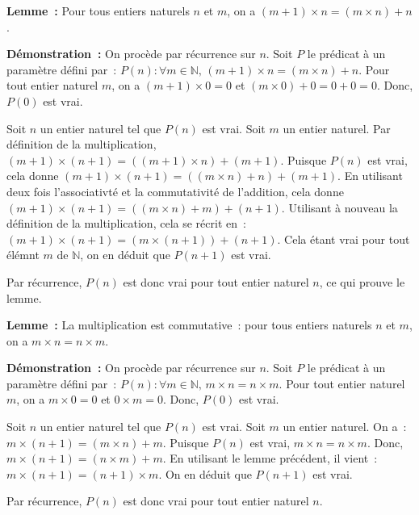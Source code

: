    \done 

\medskip

\noindent\textbf{Lemme :} Pour tous entiers naturels $n$ et $m$, on a $(m+1) \times n = (m \times n) + n$.

\medskip

\noindent\textbf{Démonstration :} On procède par récurrence sur $n$. 
    Soit $P$ le prédicat à un paramètre défini par : $P(n): \forall m \in \mathbb{N}, \, (m+1) \times n = (m \times n) + n$. 
    Pour tout entier naturel $m$, on a $(m+1) \times 0 = 0$ et $(m \times 0) + 0 = 0 + 0 = 0$. 
    Donc, $P(0)$ est vrai. 

    Soit $n$ un entier naturel tel que $P(n)$ est vrai. 
    Soit $m$ un entier naturel. 
    Par définition de la multiplication, $(m+1) \times (n+1) = ((m+1) \times n) + (m+1)$. 
    Puisque $P(n)$ est vrai, cela donne $(m+1) \times (n+1) = ((m \times n) + n) + (m+1)$. 
    En utilisant deux fois l'associativté et la commutativité de l'addition, cela donne $(m+1) \times (n+1) = ((m \times n) + m) + (n+1)$. 
    Utilisant à nouveau la définition de la multiplication, cela se récrit en : $(m+1) \times (n+1) = (m \times (n+1)) + (n+1)$. 
    Cela étant vrai pour tout élémnt $m$ de $\mathbb{N}$, on en déduit que $P(n+1)$ est vrai. 

    Par récurrence, $P(n)$ est donc vrai pour tout entier naturel $n$, ce qui prouve le lemme.

   \done 

\medskip

\noindent\textbf{Lemme :} La multiplication est commutative : pour tous entiers naturels $n$ et $m$, on a $m \times n = n \times m$.

\medskip

\noindent\textbf{Démonstration :} On procède par récurrence sur $n$. 
    Soit $P$ le prédicat à un paramètre défini par : $P(n): \forall m \in \mathbb{N}, \, m \times n = n \times m$. 
    Pour tout entier naturel $m$, on a $m \times 0 = 0$ et $0 \times m = 0$. 
    Donc, $P(0)$ est vrai. 

    Soit $n$ un entier naturel tel que $P(n)$ est vrai. 
    Soit $m$ un entier naturel. 
    On a : $m \times (n+1) = (m \times n) + m$. 
    Puisque $P(n)$ est vrai, $m \times n = n \times m$. 
    Donc, $m \times (n+1) = (n \times m) + m$. 
    En utilisant le lemme précédent, il vient : $m \times (n+1) = (n+1) \times m$. 
    On en déduit que $P(n+1)$ est vrai. 

    Par récurrence, $P(n)$ est donc vrai pour tout entier naturel $n$. 

